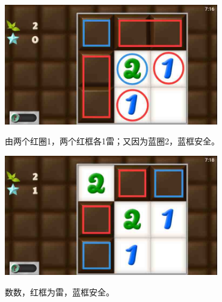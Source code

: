 \subsection{} %
\begin{center}
    \includegraphics[width=0.7\textwidth]{puzzlelow/3-1.jpg}
\end{center}
由两个红圈1，两个红框各1雷；又因为蓝圈2，蓝框安全。
\begin{center}
    \includegraphics[width=0.7\textwidth]{puzzlelow/3-2.jpg}
\end{center}
数数，红框为雷，蓝框安全。

